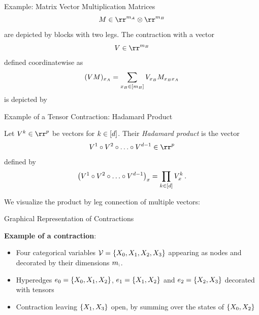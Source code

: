 \documentclass{beamer}
\begin{document}
\begin{frame}{Example: Matrix Vector Multiplication}
	Matrices 
		\[ M \in \rr^{\catdimof{A}} \otimes \rr^{\catdimof{B}} \]
	are depicted by blocks with two legs.
	\medskip 
	The contraction with a vector 
		\[ V \in \rr^{\catdimof{B}}\]
	defined coordinatewise as
		\[ (VM)_{x_{A}} = \sum_{x_{B}\in[m_{B}]} V_{x_{B}} M_{x_{B}x_{A}}\]
	is depicted by
	\begin{center}
		
	\end{center}
\end{frame}


\begin{frame}{Example of a Tensor Contraction: Hadamard Product}

	Let $V^k\in\rr^p$ be vectors for $k\in[d]$. Their \emph{Hadamard product} is the vector
	\begin{align}
		V^1\circ V^2 \circ \ldots \circ V^{\atomorder-1} \in \rr^p
	\end{align}
	defined by
	\begin{align}
		\left( V^1\circ V^2 \circ \ldots \circ V^{d-1} \right)_x = \prod_{k\in[d]} V^k_x \, . 
	\end{align}

	We visualize the product by leg connection of multiple vectors:
	\begin{center}
		
	\end{center}
		
\end{frame}



\begin{frame}{Graphical Representation of Contractions}

\textbf{Example of a contraction}:
\begin{itemize}
	\item Four categorical variables $\mathcal{V} = \{X_{0},X_{1},X_{2},X_{3}\}$ appearing as nodes and decorated by their dimensions $m_{:}$.
	\item Hyperedges  $e_0=\{X_{0},X_{1},X_{2}\}$, $e_1=\{X_{1},X_{2}\}$ and $e_2=\{X_{2},X_{3}\}$ decorated with tensors
	\item Contraction leaving $\{X_{1},X_{3}\}$ open, by summing over the states of $\{X_{0},X_{2}\}$
\end{itemize}

\begin{center}
	
\end{center}

\end{frame}
\end{document}
